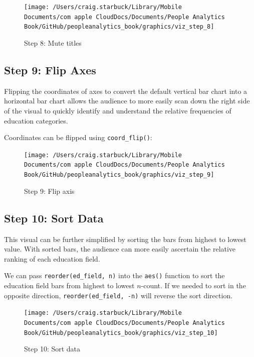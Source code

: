 \documentclass[
]{book}
\begin{document}
\begin{figure}

{\centering \texttt{[image: /Users/craig.starbuck/Library/Mobile Documents/com~apple~CloudDocs/Documents/People Analytics Book/GitHub/peopleanalytics\_book/graphics/viz\_step\_8]} 

}

\caption{Step 8: Mute titles}\label{fig:barchart-8}
\end{figure}

\hypertarget{step-9-flip-axes}{%
\subsection{Step 9: Flip Axes}\label{step-9-flip-axes}}

Flipping the coordinates of axes to convert the default vertical bar chart into a horizontal bar chart allows the audience to more easily scan down the right side of the visual to quickly identify and understand the relative frequencies of education categories.

Coordinates can be flipped using \texttt{coord\_flip()}:

\begin{figure}

{\centering \texttt{[image: /Users/craig.starbuck/Library/Mobile Documents/com~apple~CloudDocs/Documents/People Analytics Book/GitHub/peopleanalytics\_book/graphics/viz\_step\_9]} 

}

\caption{Step 9: Flip axis}\label{fig:barchart-9}
\end{figure}

\hypertarget{step-10-sort-data}{%
\subsection{Step 10: Sort Data}\label{step-10-sort-data}}

This visual can be further simplified by sorting the bars from highest to lowest value. With sorted bars, the audience can more easily ascertain the relative ranking of each education field.

We can pass \texttt{reorder(ed\_field,\ n)} into the \texttt{aes()} function to sort the education field bars from highest to lowest \(n\)-count. If we needed to sort in the opposite direction, \texttt{reorder(ed\_field,\ -n)} will reverse the sort direction.

\begin{figure}

{\centering \texttt{[image: /Users/craig.starbuck/Library/Mobile Documents/com~apple~CloudDocs/Documents/People Analytics Book/GitHub/peopleanalytics\_book/graphics/viz\_step\_10]} 

}

\caption{Step 10: Sort data}\label{fig:barchart-10}
\end{figure}
\end{document}
